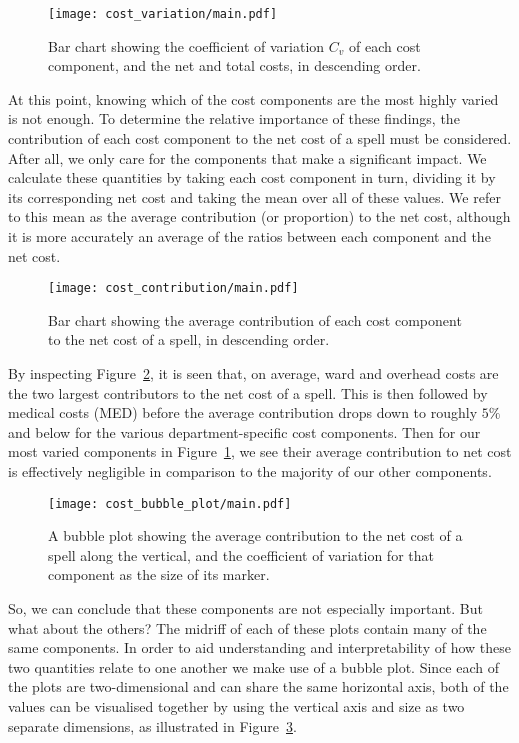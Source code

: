 \begin{figure}[h]
    \centering
    \texttt{[image: cost\_variation/main.pdf]}
    \caption{Bar chart showing the coefficient of variation \(C_{v}\) of each
        cost component, and the net and total costs, in descending
        order.}\label{fig:cost_variation}
\end{figure}

At this point, knowing which of the cost components are the most highly varied
is not enough. To determine the relative importance of these findings, the
contribution of each cost component to the net cost of a spell must be
considered. After all, we only care for the components that make a significant
impact. We calculate these quantities by taking each cost component in turn,
dividing it by its corresponding net cost and taking the mean over all of these
values. We refer to this mean as the average contribution (or proportion) to the
net cost, although it is more accurately an average of the ratios between each
component and the net cost.

\begin{figure}[h]
    \centering
    \texttt{[image: cost\_contribution/main.pdf]}
    \caption{Bar chart showing the average contribution of each cost component
        to the net cost of a spell, in descending
        order.}\label{fig:cost_contribution}
\end{figure}

By inspecting Figure~\ref{fig:cost_contribution}, it is seen that, on average,
ward and overhead costs are the two largest contributors to the net cost of a
spell. This is then followed by medical costs (MED) before the average
contribution drops down to roughly \(5\%\) and below for the various
department-specific cost components. Then for our most varied components in
Figure~\ref{fig:cost_variation}, we see their average contribution to net cost
is effectively negligible in comparison to the majority of our other components.

\begin{figure}[h]
    \centering
    \texttt{[image: cost\_bubble\_plot/main.pdf]}
    \caption{A bubble plot showing the average contribution to the net cost of a
    spell along the vertical, and the coefficient of variation for that
    component as the size of its marker.}\label{fig:cost_bubble_plot}
\end{figure}

So, we can conclude that these components are not especially important. But what
about the others? The midriff of each of these plots contain many of the same
components. In order to aid understanding and interpretability of how these two
quantities relate to one another we make use of a bubble plot. Since each of the
plots are two-dimensional and can share the same horizontal axis, both of the
values can be visualised together by using the vertical axis and size as two
separate dimensions, as illustrated in Figure~\ref{fig:cost_bubble_plot}.

